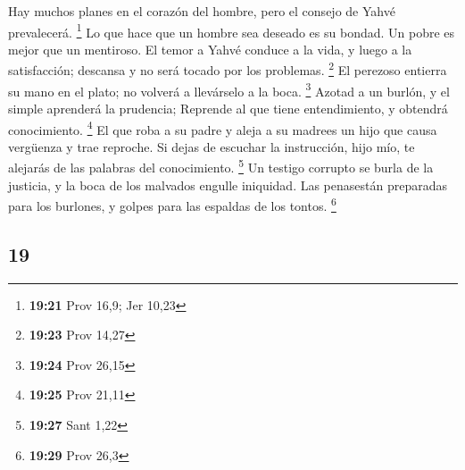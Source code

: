 \begin{paracol}{2}
 Hay muchos planes en el corazón del hombre, pero el
consejo de Yahvé prevalecerá. \footnote{\textbf{19:21} Prov 16,9; Jer
  10,23}  Lo que hace que un hombre sea deseado es su
bondad. Un pobre es mejor que un mentiroso.  El temor a
Yahvé conduce a la vida, y luego a la satisfacción; descansa y no será
tocado por los problemas. \footnote{\textbf{19:23} Prov 14,27}
 El perezoso entierra su mano en el plato; no volverá a
llevárselo a la boca. \footnote{\textbf{19:24} Prov 26,15}
 Azotad a un burlón, y el simple aprenderá la prudencia;
Reprende al que tiene entendimiento, y obtendrá conocimiento.
\footnote{\textbf{19:25} Prov 21,11}  El que roba a su
padre y aleja a su madrees un hijo que causa vergüenza y trae reproche.
 Si dejas de escuchar la instrucción, hijo mío, te
alejarás de las palabras del conocimiento. \footnote{\textbf{19:27} Sant
  1,22}  Un testigo corrupto se burla de la justicia, y
la boca de los malvados engulle iniquidad.  Las
penasestán preparadas para los burlones, y golpes para las espaldas de
los tontos. \footnote{\textbf{19:29} Prov 26,3}

\switchcolumn
\begin{otherlanguage}{english}

\hypertarget{section-37}{%
\section{19}\label{section-37}}


\end{otherlanguage}
\end{paracol}
